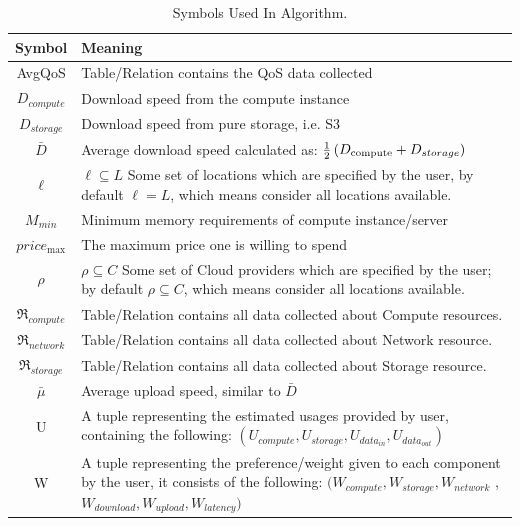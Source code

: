 \begin{table}[!ht]
\begin{center}\caption{Symbols Used In Algorithm.} \label{table:algo_symbols}
\begin{tabular}{|c|p{10cm}|}
\hline
\textbf{Symbol }&  \textbf{Meaning} \\
\hline AvgQoS &   Table/Relation contains the QoS data collected \\
\hline ${D_{compute}}$ &   Download speed from the compute instance \\
\hline ${D_{storage}}$ &   Download speed from pure storage, i.e. S3 \\
\hline $\bar D$ &   Average download speed calculated as: $\frac{1}{2}\left( {{D_{{\rm{compute}}}} + {D_{storage}}} \right)$ \\
\hline $\ell$ &  
$\ell  \subseteq L$  Some set of locations which are specified by the user, by default 
 $\ell  = L$, which means consider all locations available.
 \\
\hline $M_{min}$ & Minimum memory requirements of compute instance/server  \\
\hline $pric{e_{\max }}$ &   The maximum price one is willing to spend \\
\hline $\rho$ &   
$\rho  \subseteq C$ Some set of  Cloud  providers which are specified by  the user; by
default   $\rho  \subseteq C$, which means consider all locations available. \\
\hline ${\Re _{compute}}$ &  Table/Relation contains all data collected about Compute resources.  \\
\hline ${\Re _{network}}$ &  Table/Relation contains all data collected about Network resource. \\
\hline ${\Re _{storage}}$ & Table/Relation contains all data collected about Storage resource. \\
\hline $\bar \mu $ &   Average upload speed, similar to $\bar D$ \\
\hline U & A tuple representing the estimated usages provided by user, containing the
following: $( U_{compute} , U_{storage} , U_{data_{in}} , U_{data_{out}} )$\\
\hline W & A tuple representing the preference/weight given to each component by the user, it consists of the following: 
$( W_{compute} , W_{storage}, W_{network} $ , $ W_{download} , W_{upload}, W_{latency} )$ \\
\hline
\end{tabular}
\end{center}
\end{table}


